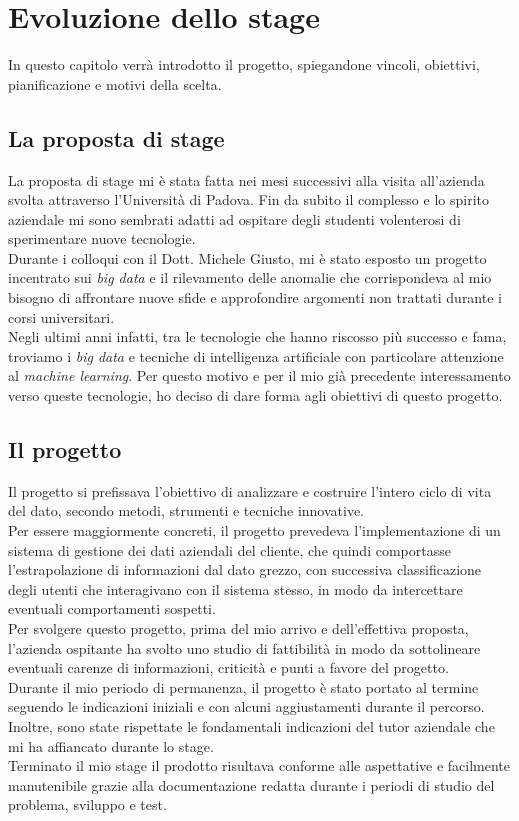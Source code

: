 
\chapter{Evoluzione dello stage}\label{ch:evoluzione-dello-stage}
In questo capitolo verrà introdotto il progetto, spiegandone vincoli, obiettivi, pianificazione e motivi della scelta.
\section{La proposta di stage}
La proposta di stage mi è stata fatta nei mesi successivi alla visita all'azienda svolta attraverso l'Università di Padova. Fin da subito il complesso e lo spirito aziendale mi sono sembrati adatti ad ospitare degli studenti volenterosi di sperimentare nuove tecnologie.
\\
Durante i colloqui con il Dott. Michele Giusto, mi è stato esposto un progetto incentrato sui \emph{big data} e il rilevamento delle anomalie che corrispondeva al mio bisogno di affrontare nuove sfide e approfondire argomenti non trattati durante i corsi universitari.
\\
Negli ultimi anni infatti, tra le tecnologie che hanno riscosso più successo e fama, troviamo i \emph{big data} e tecniche di intelligenza artificiale con particolare attenzione al \emph{machine learning}.
Per questo motivo e per il mio già precedente interessamento verso queste tecnologie, ho deciso di dare forma agli obiettivi di questo progetto. 

\section{Il progetto}
Il progetto si prefissava l'obiettivo di analizzare e costruire l'intero ciclo di vita del dato, secondo metodi, strumenti e tecniche innovative.
\\
Per essere maggiormente concreti, il progetto prevedeva l'implementazione di un sistema di gestione dei dati aziendali del cliente, che quindi comportasse l'estrapolazione di informazioni dal dato grezzo, con successiva classificazione degli utenti che interagivano con il sistema stesso, in modo da intercettare eventuali comportamenti sospetti.
\\
Per svolgere questo progetto, prima del mio arrivo e dell'effettiva proposta, l'azienda ospitante ha svolto uno studio di fattibilità in modo da sottolineare eventuali carenze di informazioni, criticità e punti a favore del progetto.
\\
Durante il mio periodo di permanenza, il progetto è stato portato al termine seguendo le indicazioni iniziali e con alcuni aggiustamenti durante il percorso. Inoltre, sono state rispettate le fondamentali indicazioni del tutor aziendale che mi ha affiancato durante lo stage.
\\
Terminato il mio stage il prodotto risultava conforme alle aspettative e facilmente manutenibile grazie alla documentazione redatta durante i periodi di studio del problema, sviluppo e test.

